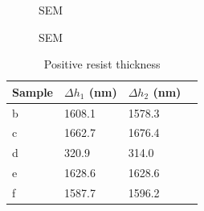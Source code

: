 \begin{figure}[H]
	\centering
	\caption{SEM}
	\label{fig:b2d28_q28}
\end{figure}
\begin{figure}[H]
	\centering
	\caption{SEM}
	\label{fig:b2d29_q29}
\end{figure}

\begin{table}[H]
    \centering
    \caption{Positive resist thickness}
    \begin{tabular}{X l l l}
        Sample & $\Delta h_1$ (nm)& $\Delta h_2$ (nm) \\ 
        \hline\hline
        b & 1608.1  &   1578.3  \\
        c & 1662.7  &   1676.4  \\
        d & 320.9   &   314.0   \\
        e & 1628.6  &   1628.6  \\
        f & 1587.7  &   1596.2  \\
        \hline
    \end{tabular}
    \label{tab:pos_profile}
\end{table}

